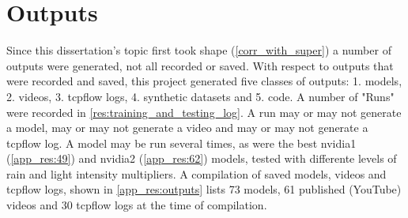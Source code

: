 \section{Outputs}
Since this dissertation's topic first took shape (\ref{corr_with_super}) a number of outputs were generated, not all recorded or saved. With respect to outputs that were recorded and saved, this project generated five classes of outputs: 1. models, 2. videos, 3. tcpflow logs, 4. synthetic datasets and 5. code. A number of "Runs" were recorded in \ref{res:training_and_testing_log}. A run may or may not generate a model, may or may not generate a video and may or may not generate a tcpflow log. A model may be run several times, as were the best nvidia1 (\ref{app_res:49}) and nvidia2 (\ref{app_res:62}) models, tested with differente levels of rain and light intensity multipliers.
A compilation of saved models, videos and tcpflow logs, shown in \ref{app_res:outputs} lists 73 models, 61 published (YouTube) videos and 30 tcpflow logs at the time of compilation.



